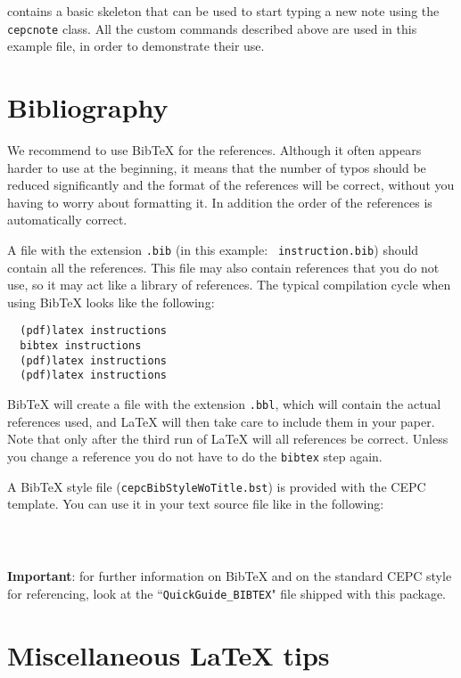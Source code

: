 \documentclass[11pt,a4paper]{cepcnote}
\newcommand{\BibTeX}{{\sc Bib\TeX}}
\begin{document}
 contains a basic skeleton that can be
used to start typing a new note using the {\tt cepcnote} class. All
the custom commands described above are used in this example file, in
order to demonstrate their use.

\section{Bibliography}
\label{app:References}

We recommend to use \BibTeX{} for the references. Although it often
appears harder to use at the beginning, it means that the number of
typos should be reduced significantly and the format of the references
will be correct, without you having to worry about formatting it. In
addition the order of the references is automatically correct.

A file with the extension {\tt .bib} (in this example: {\tt
instruction.bib}) should contain all the references. This file may
also contain references that you do not use, so it may act like a
library of references. The typical compilation cycle when using
\BibTeX{} looks like the following:
%
\begin{verbatim}
  (pdf)latex instructions
  bibtex instructions
  (pdf)latex instructions
  (pdf)latex instructions
\end{verbatim}
%
\BibTeX{} will create a file with the extension {\tt .bbl}, which will
contain the actual references used, and \LaTeX{} will then take care
to include them in your paper. Note that only after the third run of
\LaTeX{} will all references be correct. Unless you change a reference
you do not have to do the {\tt bibtex} step again.

A \BibTeX{} style file ({\tt cepcBibStyleWoTitle.bst}) is provided with the
CEPC template. You can use it in your text source file like in the
following:
%
\begin{verbatim}
  
  
\end{verbatim}
%

{\color{red} \textbf{Important}:} for further information on \BibTeX{} and on the standard CEPC style for referencing, look at the ``{\tt QuickGuide\_BIBTEX}" file shipped with this package.


\section{Miscellaneous \LaTeX{} tips}
\label{app:LatexTips}
\end{document}
